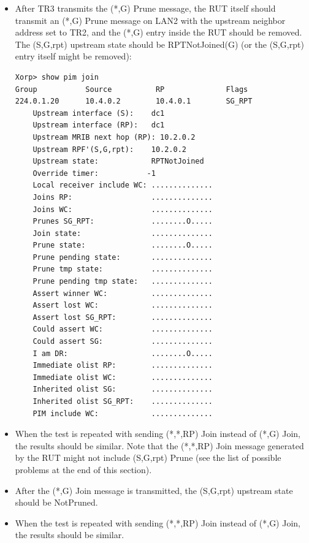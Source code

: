 \documentclass[11pt]{report}
\begin{document}
\begin{itemize}
  \item After TR3 transmits the (*,G) Prune message, the RUT
  itself should transmit an (*,G) Prune message on LAN2 with the upstream
  neighbor address set to TR2, and the (*,G) entry inside the RUT should be
  removed. The (S,G,rpt) upstream state should be RPTNotJoined(G) (or the
  (S,G,rpt) entry itself might be removed):

\begin{verbatim}
Xorp> show pim join 
Group           Source          RP              Flags
224.0.1.20      10.4.0.2        10.4.0.1        SG_RPT 
    Upstream interface (S):    dc1
    Upstream interface (RP):   dc1
    Upstream MRIB next hop (RP): 10.2.0.2
    Upstream RPF'(S,G,rpt):    10.2.0.2
    Upstream state:            RPTNotJoined 
    Override timer:           -1
    Local receiver include WC: ..............
    Joins RP:                  ..............
    Joins WC:                  ..............
    Prunes SG_RPT:             ........O.....
    Join state:                ..............
    Prune state:               ........O.....
    Prune pending state:       ..............
    Prune tmp state:           ..............
    Prune pending tmp state:   ..............
    Assert winner WC:          ..............
    Assert lost WC:            ..............
    Assert lost SG_RPT:        ..............
    Could assert WC:           ..............
    Could assert SG:           ..............
    I am DR:                   ........O.....
    Immediate olist RP:        ..............
    Immediate olist WC:        ..............
    Inherited olist SG:        ..............
    Inherited olist SG_RPT:    ..............
    PIM include WC:            ..............
\end{verbatim}

  \item When the test is repeated with sending (*,*,RP) Join instead of (*,G)
  Join, the results should be similar.
  Note that the (*,*,RP) Join message generated by the RUT might not include
  (S,G,rpt) Prune (see the list of possible problems at the end of this
  section).

\end{itemize}


\begin{itemize}

  \item After the (*,G) Join message is transmitted, the (S,G,rpt) upstream
  state should be NotPruned.

  \item When the test is repeated with sending (*,*,RP) Join instead of (*,G)
  Join, the results should be similar.

\end{itemize}
\end{document}

